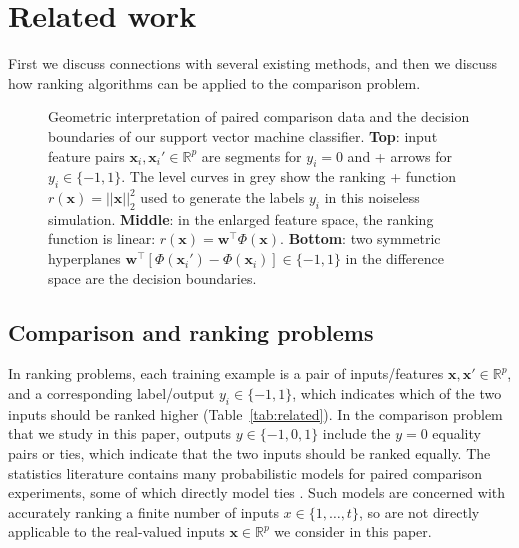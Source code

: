 \documentclass[twoside,11pt]{article}
\newcommand{\RR}{\mathbb R}
\begin{document}
\section{Related work}
\label{sec:related}

First we discuss connections with several existing methods, and then
we discuss how ranking algorithms can be applied to the comparison
problem.


\begin{figure}
   \centering

\vskip -0.5cm

	\caption{Geometric interpretation of paired comparison data and the decision boundaries of our support vector machine classifier. \textbf{Top}: input feature pairs
		$\mathbf x_i,\mathbf x_i'\in\RR^p$ are segments for $y_i=0$ and
		+    arrows for $y_i\in\{-1,1\}$. The level curves in grey show the ranking
		+    function $r(\mathbf x)=||\mathbf x||_2^2$ used to generate the labels $y_i$ in this noiseless simulation. \textbf{Middle}: in the enlarged feature
		space, the ranking function is linear: $r(\mathbf x)=\mathbf
		w^\intercal \Phi(\mathbf x)$. \textbf{Bottom}: two symmetric
		hyperplanes $\mathbf w^\intercal[\Phi(\mathbf x_i')-\Phi(\mathbf x_i)]\in\{-1,1\}$ in the difference space are the decision boundaries.}
\label{fig:norm-data}
\end{figure}

\subsection{Comparison and ranking problems}

In ranking problems, each training example is a pair of
inputs/features $\mathbf x,\mathbf x'\in\RR^p$, and a corresponding
label/output $y_i\in\{-1,1\}$, which indicates which of the two inputs
should be ranked higher (Table~\ref{tab:related}). In the comparison
problem that we study in this paper, outputs $y\in\{-1,0,1\}$ include
the $y=0$ equality pairs or ties, which indicate that the two inputs
should be ranked equally.  The statistics literature contains many
probabilistic models for paired comparison experiments, some of which
directly model ties \citep{davidson-ties}. Such models are concerned
with accurately ranking a finite number of inputs $x\in\{1,\dots,t\}$,
so are not directly applicable to the real-valued inputs
$\mathbf x\in\RR^p$ we consider in this paper. 
\end{document}
